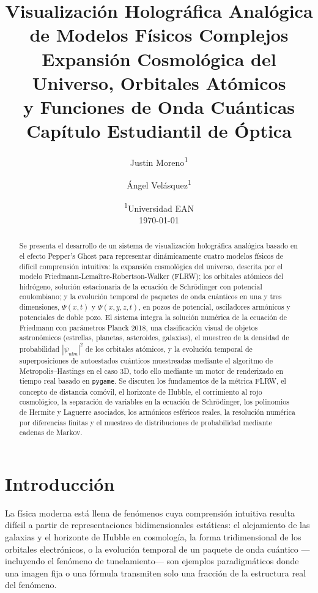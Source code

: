 \documentclass[12pt, a4paper]{article}
\title{%
  \textbf{Visualización Holográfica Analógica\\
  de Modelos Físicos Complejos}\\[0.8em]
  \large Expansión Cosmológica del Universo, Orbitales Atómicos\\
  y Funciones de Onda Cuánticas\\[0.5em]
  \normalsize Capítulo Estudiantil de Óptica
}
\author{
  Justin Moreno\textsuperscript{1} \and
  Ángel Velásquez\textsuperscript{1}
}
\date{
  \textsuperscript{1}Universidad EAN \\[0.5em]
  \today
}
\begin{document}
\maketitle

\begin{abstract}
Se presenta el desarrollo de un sistema de visualización holográfica
analógica basado en el efecto Pepper's Ghost para representar
dinámicamente cuatro modelos físicos de difícil comprensión intuitiva:
la expansión cosmológica del universo, descrita por el modelo
Friedmann-Lemaître-Robertson-Walker (FLRW); los orbitales atómicos del
hidrógeno, solución estacionaria de la ecuación de Schrödinger con
potencial coulombiano; y la evolución temporal de paquetes de onda
cuánticos en una y tres dimensiones, $\Psi(x,t)$ y $\Psi(x,y,z,t)$,
en pozos de potencial, osciladores armónicos y potenciales de doble
pozo. El sistema integra la solución numérica de la ecuación de
Friedmann con parámetros Planck 2018, una clasificación visual de
objetos astronómicos (estrellas, planetas, asteroides, galaxias), el
muestreo de la densidad de probabilidad $|\psi_{nlm}|^2$ de los
orbitales atómicos, y la evolución temporal de superposiciones de
autoestados cuánticos muestreadas mediante el algoritmo de
Metropolis--Hastings en el caso 3D, todo ello mediante un motor de
renderizado en tiempo real basado en \texttt{pygame}. Se discuten los
fundamentos de la métrica FLRW, el concepto de distancia comóvil, el
horizonte de Hubble, el corrimiento al rojo cosmológico, la separación
de variables en la ecuación de Schrödinger, los polinomios de
Hermite y Laguerre asociados, los armónicos esféricos reales, la
resolución numérica por diferencias finitas y el muestreo de
distribuciones de probabilidad mediante cadenas de Markov.
\end{abstract}

\tableofcontents
\newpage

\section{Introducción}

La física moderna está llena de fenómenos cuya comprensión intuitiva
resulta difícil a partir de representaciones bidimensionales estáticas:
el alejamiento de las galaxias y el horizonte de Hubble en cosmología,
la forma tridimensional de los orbitales electrónicos, o la evolución
temporal de un paquete de onda cuántico —incluyendo el fenómeno de
tunelamiento— son ejemplos paradigmáticos donde una imagen fija o una
fórmula transmiten solo una fracción de la estructura real del
fenómeno.
\end{document}
